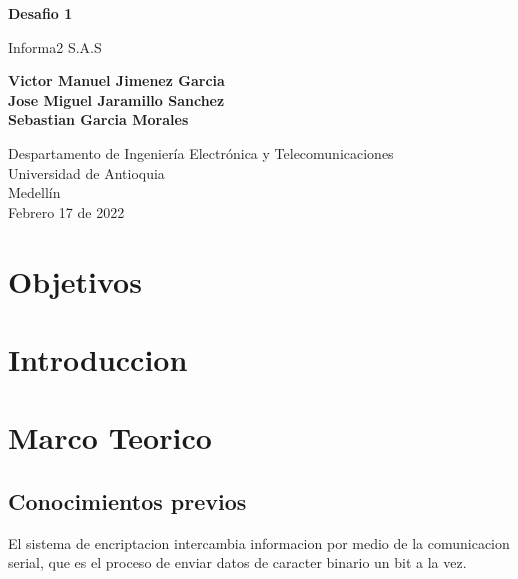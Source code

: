 \documentclass{article}
\begin{document}
\begin{titlepage}
    \begin{center}
        \vspace*{1cm}
            
        \Huge
        \textbf{Desafio 1}
            
        \vspace{0.5cm}
        \LARGE
        Informa2 S.A.S
            
        \vspace{1.5cm}
            
        \textbf{Victor Manuel Jimenez Garcia\\
                Jose Miguel Jaramillo Sanchez\\
                Sebastian Garcia Morales}

        \vfill
            
        \vspace{0.8cm}
            
        \Large
        Despartamento de Ingeniería Electrónica y Telecomunicaciones\\
        Universidad de Antioquia\\
        Medellín\\
        Febrero 17 de 2022
            
    \end{center}
\end{titlepage}

\tableofcontents

\newpage
\section{Objetivos}\label{objetivos}
\section{Introduccion}\label{intro}
\section{Marco Teorico}\label{marco}

\subsection{Conocimientos previos}

El sistema de encriptacion intercambia informacion por medio de la comunicacion serial, que es el proceso de enviar datos de caracter binario un bit a la vez.
\end{document}

